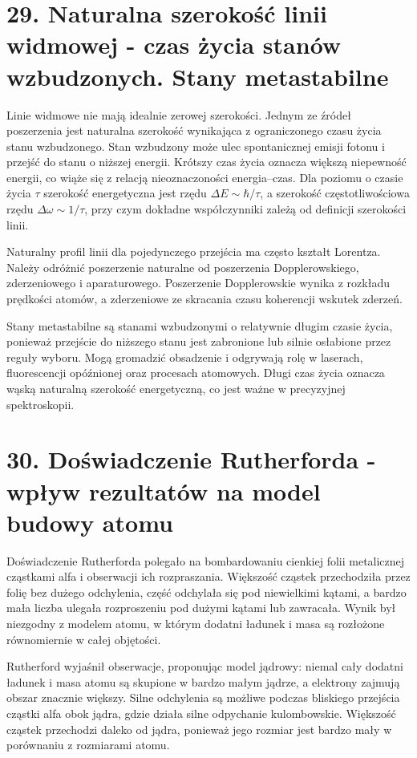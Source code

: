 \documentclass[11pt,a4paper,oneside]{report}
\begin{document}
\section{29. Naturalna szerokość linii widmowej - czas życia stanów wzbudzonych. Stany metastabilne}
Linie widmowe nie mają idealnie zerowej szerokości. Jednym ze źródeł poszerzenia jest naturalna szerokość wynikająca z ograniczonego czasu życia stanu wzbudzonego. Stan wzbudzony może ulec spontanicznej emisji fotonu i przejść do stanu o niższej energii. Krótszy czas życia oznacza większą niepewność energii, co wiąże się z relacją nieoznaczoności energia–czas. Dla poziomu o czasie życia \(\tau\) szerokość energetyczna jest rzędu \(\Delta E\sim\hbar/\tau\), a szerokość częstotliwościowa rzędu \(\Delta\omega\sim1/\tau\), przy czym dokładne współczynniki zależą od definicji szerokości linii.

Naturalny profil linii dla pojedynczego przejścia ma często kształt Lorentza. Należy odróżnić poszerzenie naturalne od poszerzenia Dopplerowskiego, zderzeniowego i aparaturowego. Poszerzenie Dopplerowskie wynika z rozkładu prędkości atomów, a zderzeniowe ze skracania czasu koherencji wskutek zderzeń.

Stany metastabilne są stanami wzbudzonymi o relatywnie długim czasie życia, ponieważ przejście do niższego stanu jest zabronione lub silnie osłabione przez reguły wyboru. Mogą gromadzić obsadzenie i odgrywają rolę w laserach, fluorescencji opóźnionej oraz procesach atomowych. Długi czas życia oznacza wąską naturalną szerokość energetyczną, co jest ważne w precyzyjnej spektroskopii.

\section{30. Doświadczenie Rutherforda - wpływ rezultatów na model budowy atomu}
Doświadczenie Rutherforda polegało na bombardowaniu cienkiej folii metalicznej cząstkami alfa i obserwacji ich rozpraszania. Większość cząstek przechodziła przez folię bez dużego odchylenia, część odchylała się pod niewielkimi kątami, a bardzo mała liczba ulegała rozproszeniu pod dużymi kątami lub zawracała. Wynik był niezgodny z modelem atomu, w którym dodatni ładunek i masa są rozłożone równomiernie w całej objętości.

Rutherford wyjaśnił obserwacje, proponując model jądrowy: niemal cały dodatni ładunek i masa atomu są skupione w bardzo małym jądrze, a elektrony zajmują obszar znacznie większy. Silne odchylenia są możliwe podczas bliskiego przejścia cząstki alfa obok jądra, gdzie działa silne odpychanie kulombowskie. Większość cząstek przechodzi daleko od jądra, ponieważ jego rozmiar jest bardzo mały w porównaniu z rozmiarami atomu.
\end{document}
